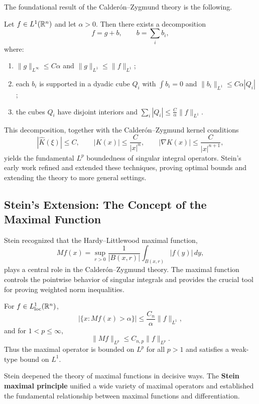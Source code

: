 The foundational result of the Calder\'on--Zygmund theory is the following.

\begin{theorem}
Let \(f \in L^1(\mathbb{R}^n)\) and let \(\alpha > 0\). Then there exists a decomposition
\[
f = g + b, \qquad b = \sum_i b_i,
\]
where:
\begin{enumerate}
    \item \(\|g\|_{L^\infty} \leq C\alpha\) and \(\|g\|_{L^1} \leq \|f\|_{L^1}\);
    \item each \(b_i\) is supported in a dyadic cube \(Q_i\) with \(\int b_i = 0\) and \(\|b_i\|_{L^1} \leq C\alpha |Q_i|\);
    \item the cubes \(Q_i\) have disjoint interiors and \(\sum_i |Q_i| \leq \frac{C}{\alpha} \|f\|_{L^1}\).
\end{enumerate}
\end{theorem}

This decomposition, together with the Calder\'on--Zygmund kernel conditions
\[
|\widehat{K}(\xi)| \leq C, \qquad |K(x)| \leq \frac{C}{|x|^n}, \qquad |\nabla K(x)| \leq \frac{C}{|x|^{n+1}},
\]
yields the fundamental \(L^p\) boundedness of singular integral operators. Stein's early work refined and extended these techniques, proving optimal bounds and extending the theory to more general settings.

\subsection{Stein's Extension: The Concept of the Maximal Function}

Stein recognized that the Hardy--Littlewood maximal function,
\[
Mf(x) = \sup_{r > 0} \frac{1}{|B(x,r)|} \int_{B(x,r)} |f(y)|\,dy,
\]
plays a central role in the Calder\'on--Zygmund theory. The maximal function controls the pointwise behavior of singular integrals and provides the crucial tool for proving weighted norm inequalities.

\begin{theorem}
For \(f \in L^1_{\text{loc}}(\mathbb{R}^n)\),
\[
|\{x : Mf(x) > \alpha\}| \leq \frac{C_n}{\alpha} \|f\|_{L^1},
\]
and for \(1 < p \leq \infty\),
\[
\|Mf\|_{L^p} \leq C_{n,p} \|f\|_{L^p}.
\]
Thus the maximal operator is bounded on \(L^p\) for all \(p>1\) and satisfies a weak-type bound on \(L^1\).
\end{theorem}

Stein deepened the theory of maximal functions in decisive ways. The \textbf{Stein maximal principle} unified a wide variety of maximal operators and established the fundamental relationship between maximal functions and differentiation.

